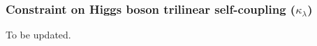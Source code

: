 \subsubsection{Constraint on Higgs boson trilinear self-coupling ($\kappa_{\lambda}$)}
To be updated.
%
